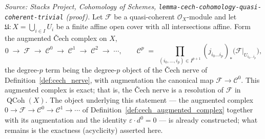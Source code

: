\begin{lemma}
  \textit{Source: Stacks Project, Cohomology of Schemes,
  \texttt{lemma-cech-cohomology-quasi-coherent-trivial} (proof).}
  Let \(\mathcal{F}\) be a quasi-coherent \(\mathcal{O}_X\)-module and let
  \(\mathfrak{U} : X = \bigcup_{i \in I} U_i\) be a finite affine open cover with all
  intersections affine. Form the augmented {\v C}ech complex on \(X\),
  \[
    0 \;\to\; \mathcal{F} \;\to\; \mathcal{C}^0 \;\to\; \mathcal{C}^1 \;\to\;
    \mathcal{C}^2 \;\to\; \cdots,
    \qquad
    \mathcal{C}^p \;=\; \prod_{(i_0, \ldots, i_p) \in I^{p+1}}
      (j_{i_0 \ldots i_p})_*\bigl(\mathcal{F}|_{U_{i_0 \ldots i_p}}\bigr),
  \]
  the degree-\(p\) term being the degree-\(p\) object of the {\v C}ech nerve of
  Definition~\ref{def:cech_nerve}, with augmentation the canonical map
  \(\mathcal{F} \to \mathcal{C}^0\). This augmented complex is exact; that is, the
  {\v C}ech nerve is a resolution of \(\mathcal{F}\) in \(\operatorname{QCoh}(X)\).
  The object underlying this statement --- the augmented complex
  \(0 \to \mathcal{F} \to \mathcal{C}^0 \to \mathcal{C}^1 \to \cdots\) of
  Definition~\ref{def:cech_augmented_complex} together with its augmentation and the identity
  \(\varepsilon \cdot d^0 = 0\) --- is already constructed; what remains is the
  exactness (acyclicity) asserted here.
\end{lemma}

